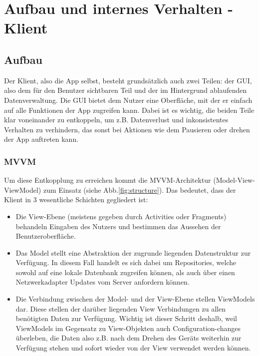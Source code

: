 \documentclass[parskip=full,11pt]{scrartcl}
\begin{document}
\section{Aufbau und internes Verhalten - Klient}

\subsection{Aufbau}
Der Klient, also die App selbst, besteht grundsätzlich auch zwei Teilen:
der GUI, also dem für den Benutzer sichtbaren Teil und der im Hintergrund
ablaufenden Datenverwaltung.
Die GUI bietet dem Nutzer eine Oberfläche, mit der er einfach auf alle
Funktionen der App zugreifen kann.
Dabei ist es wichtig, die beiden Teile klar voneinander zu entkoppeln,
um z.B. Datenverlust und inkonsistentes Verhalten zu verhindern, das sonst
bei Aktionen wie dem Pausieren oder drehen der App auftreten kann.

\subsubsection{MVVM}
Um diese Entkopplung zu erreichen kommt die MVVM-Architektur
(Model-View-ViewModel) zum Einsatz (siehe Abb.\ref{fig:structure}).
Das bedeutet, dass der Klient in 3 wesentliche Schichten gegliedert ist:
\begin{itemize}
	\item Die View-Ebene (meistens gegeben durch Activities oder Fragments)
        behandeln Eingaben des Nutzers und bestimmen das Aussehen der
        Benutzeroberfläche.
	\item Das Model stellt eine Abstraktion der zugrunde liegenden
        Datenstruktur zur Verfügung. In diesem Fall handelt es sich dabei um
        Repositories, welche sowohl auf eine lokale Datenbank zugreifen können,
        als auch über einen Netzwerkadapter Updates vom Server anfordern
        können.
	\item Die Verbindung zwischen der Model- und der View-Ebene stellen
        ViewModels dar. Diese stellen der darüber liegenden View Verbindungen
        zu allen benötigten Daten zur Verfügung.
	    Wichtig ist dieser Schritt deshalb, weil ViewModels im Gegensatz zu
        View-Objekten auch Configuration-changes überleben, die Daten also z.B.
        nach dem Drehen des Geräts weiterhin zur Verfügung stehen und sofort
        wieder von der View verwendet werden können.
\end{itemize}
\end{document}
